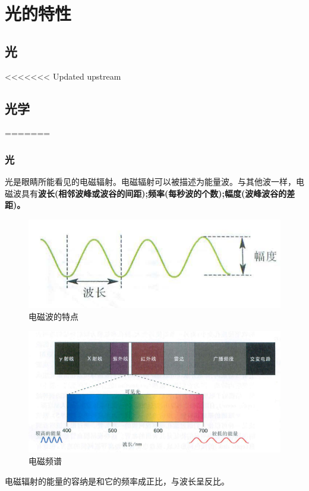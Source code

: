 \section{光的特性}
\subsection{光}
<<<<<<< Updated upstream
\subsection{光学}
=======
\begin{frame}
    \frametitle{光}
    光是眼睛所能看见的电磁辐射。电磁辐射可以被描述为能量波。与其他波一样，电磁波具有\bf{波长}(相邻波峰或波谷的间距);\bf{频率}(每秒波的个数);\bf{幅度}(波峰波谷的差距)。
    \begin{figure}
        \centering
        \includegraphics{img/sec1-1.png}
        \caption{电磁波的特点\label{sec1-1}}
    \end{figure}
    \begin{figure}
        \centering
        \includegraphics{img/sec1-2.png}
        \caption{电磁频谱\label{sec1-2}}
    \end{figure}
\end{frame}
    电磁辐射的能量的容纳是和它的频率成正比，与波长呈反比。
